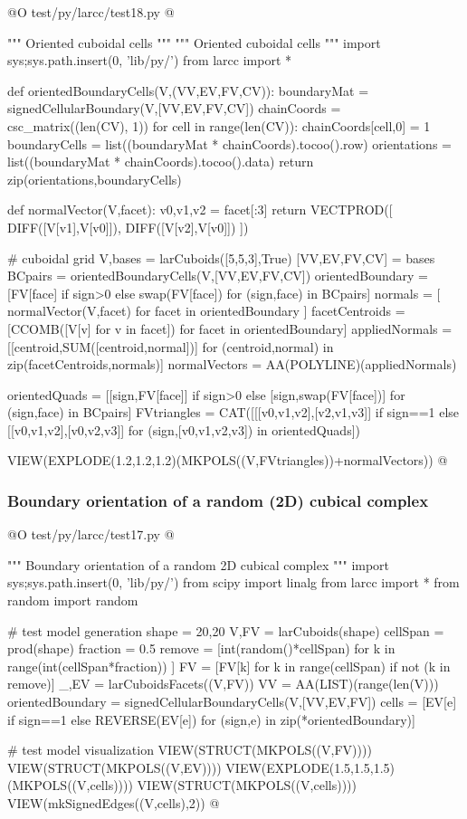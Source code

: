\documentclass[11pt,oneside]{article}	%
\begin{document}
@O test/py/larcc/test18.py
@{""" Oriented cuboidal cells """
""" Oriented cuboidal cells """
import sys;sys.path.insert(0, 'lib/py/')
from larcc import *

def orientedBoundaryCells(V,(VV,EV,FV,CV)):
    boundaryMat = signedCellularBoundary(V,[VV,EV,FV,CV])
    chainCoords = csc_matrix((len(CV), 1))
    for cell in range(len(CV)): chainCoords[cell,0] = 1
    boundaryCells = list((boundaryMat * chainCoords).tocoo().row)
    orientations = list((boundaryMat * chainCoords).tocoo().data)
    return zip(orientations,boundaryCells)

def normalVector(V,facet):
    v0,v1,v2 = facet[:3]
    return VECTPROD([ DIFF([V[v1],V[v0]]), DIFF([V[v2],V[v0]]) ])

# cuboidal grid
V,bases = larCuboids([5,5,3],True)
[VV,EV,FV,CV] = bases
BCpairs = orientedBoundaryCells(V,[VV,EV,FV,CV])
orientedBoundary = [FV[face] if sign>0 else swap(FV[face]) for (sign,face) in BCpairs]
normals = [ normalVector(V,facet)  for facet in orientedBoundary ]
facetCentroids = [CCOMB([V[v] for v in facet]) for facet in orientedBoundary]
appliedNormals = [[centroid,SUM([centroid,normal])] for (centroid,normal) in zip(facetCentroids,normals)]
normalVectors = AA(POLYLINE)(appliedNormals)

orientedQuads = [[sign,FV[face]] if sign>0 else [sign,swap(FV[face])] for (sign,face) in BCpairs]
FVtriangles = CAT([[[v0,v1,v2],[v2,v1,v3]] if sign==1 else [[v0,v1,v2],[v0,v2,v3]]
            for (sign,[v0,v1,v2,v3]) in orientedQuads])

VIEW(EXPLODE(1.2,1.2,1.2)(MKPOLS((V,FVtriangles))+normalVectors))
@}





\subsubsection{Boundary orientation of a random (2D) cubical complex}

@O test/py/larcc/test17.py
@{""" Boundary orientation of a random 2D cubical complex """
import sys;sys.path.insert(0, 'lib/py/')
from scipy import linalg
from larcc import *
from random import random

# test model generation
shape = 20,20
V,FV = larCuboids(shape)
cellSpan = prod(shape)
fraction = 0.5
remove = [int(random()*cellSpan) for k in range(int(cellSpan*fraction)) ]
FV = [FV[k] for k in range(cellSpan) if not (k in remove)]
_,EV = larCuboidsFacets((V,FV))
VV = AA(LIST)(range(len(V)))
orientedBoundary = signedCellularBoundaryCells(V,[VV,EV,FV])
cells = [EV[e] if sign==1 else REVERSE(EV[e]) for (sign,e) in zip(*orientedBoundary)]

# test model visualization
VIEW(STRUCT(MKPOLS((V,FV))))
VIEW(STRUCT(MKPOLS((V,EV))))
VIEW(EXPLODE(1.5,1.5,1.5)(MKPOLS((V,cells))))
VIEW(STRUCT(MKPOLS((V,cells))))
VIEW(mkSignedEdges((V,cells),2))
@}
\end{document}
